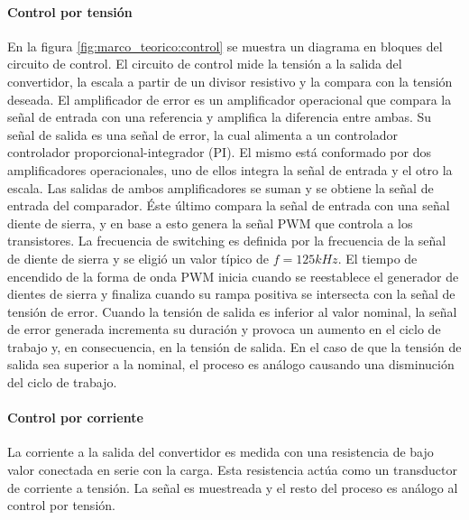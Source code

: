\paragraph{Control por tensión}
En la figura \ref{fig:marco_teorico:control} se muestra un diagrama en bloques del circuito de control.
El circuito de control mide la tensión a la salida del convertidor, la escala a partir de un divisor resistivo y la compara con la tensión deseada.
El amplificador de error es un amplificador operacional que compara la señal de entrada con una referencia y
amplifica la diferencia entre ambas. Su señal de salida es una señal de error, la cual alimenta a un controlador controlador proporcional-integrador (PI).
El mismo está conformado por dos amplificadores operacionales, uno de ellos integra la señal de entrada y el otro la escala.
Las salidas de ambos amplificadores se suman y se obtiene la señal de entrada del comparador.
Éste último compara la señal de entrada con una señal diente de sierra, y en base a esto genera la señal PWM que controla a los transistores.
La frecuencia de switching es definida por la frecuencia de la señal de diente de sierra y se eligió un valor típico de $f=125kHz$.
El tiempo de encendido de la forma de onda PWM inicia cuando se reestablece el generador de dientes de sierra y finaliza cuando su rampa positiva se intersecta con la señal de tensión de error.
Cuando la tensión de salida es inferior al valor nominal, la señal de error generada incrementa su duración y provoca un aumento en el ciclo de trabajo y, en consecuencia, en la tensión de salida. 
En el caso de que la tensión de salida sea superior a la nominal, el proceso es análogo causando una disminución del ciclo de trabajo. 


\paragraph{Control por corriente}
La corriente a la salida del convertidor es medida con una resistencia de bajo valor conectada en serie con la carga.
Esta resistencia actúa como un transductor de corriente a tensión.
La señal es muestreada y el resto del proceso es análogo al control por tensión.\\

